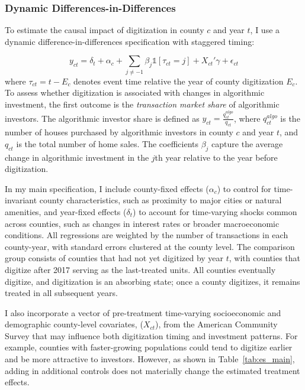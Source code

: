 \documentclass[11pt]{article}
\begin{document}
\subsubsection{Dynamic Differences-in-Differences}\label{sec:diffindiff}
To estimate the causal impact of digitization in county $c$ and year $t$, I use a dynamic difference-in-differences specification with staggered timing:


\begin{equation} \label{eq:es_main}
y_{ct} = \delta_{t} + \alpha_{c} + \sum_{j \ne -1} \beta_{j} \mathds{1}[\tau_{ct} = j] + X_{ct}'\gamma + \epsilon_{ct}
\end{equation}
where $\tau_{ct} = t- E_c$ denotes event time relative the year of county digitization $E_c$. To assess whether digitization is associated with changes in algorithmic investment, the first outcome is the \textit{transaction market share} of algorithmic investors. The algorithmic investor share is defined as $y_{ct} =\frac{q^{algo}_{ct}}{q_{ct}}$, where $q^{algo}_{ct}$ is the number of houses purchased by algorithmic investors in county $c$ and year $t$, and $q_{ct}$ is the total number of home sales. The coefficients $\beta_j$ capture the average change in algorithmic investment in the $j$th year relative to the year before digitization. 

In my main specification, I include county-fixed effects ($\alpha_{c}$) to control for time-invariant county characteristics, such as proximity to major cities or natural amenities, and year-fixed effects ($\delta_{t}$) to account for time-varying shocks common across counties, such as changes in interest rates or broader macroeconomic conditions.  All regressions are weighted by the number of transactions in each county-year, with standard errors clustered at the county level. The comparison group consists of counties that had not yet digitized by year $t$, with counties that digitize after 2017 serving as the last-treated units. All counties eventually digitize, and digitization is an absorbing state; once a county digitizes, it remains treated in all subsequent years.

I also incorporate a vector of pre-treatment time-varying socioeconomic and demographic county-level covariates, ($X_{ct}$), from the American Community Survey that may influence both digitization timing and investment patterns. For example, counties with faster-growing populations could tend to digitize earlier and be more attractive to investors. However, as shown in Table~\ref{tab:es_main}, adding in additional controls does not materially change the estimated treatment effects. 
\end{document}
